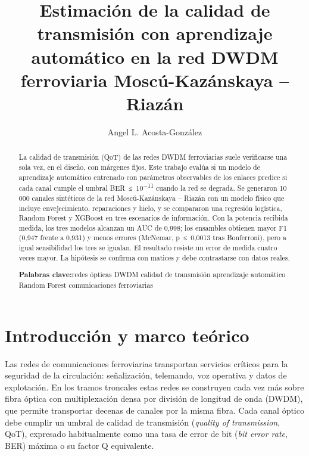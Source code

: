 \documentclass[runningheads]{llncs}
\def\keywordname{\textbf{Palabras clave:}}
\newcommand{\keywords}[1]{\par\addvspace\baselineskip\noindent\keywordname\enspace\ignorespaces#1}
\begin{document}
\mainmatter

\title{Estimación de la calidad de transmisión con aprendizaje automático en la red DWDM ferroviaria Moscú-Kazánskaya – Riazán}
\author{Angel L. Acosta-González}
\maketitle

\begin{abstract}
La calidad de transmisión (QoT) de las redes DWDM ferroviarias suele verificarse una sola vez, en el diseño, con márgenes fijos. Este trabajo evalúa si un modelo de aprendizaje automático entrenado con parámetros observables de los enlaces predice si cada canal cumple el umbral BER~≤~10\textsuperscript{−11} cuando la red se degrada. Se generaron 10 000 canales sintéticos de la red Moscú-Kazánskaya – Riazán con un modelo físico que incluye envejecimiento, reparaciones y hielo, y se compararon una regresión logística, Random Forest y XGBoost en tres escenarios de información. Con la potencia recibida medida, los tres modelos alcanzan un AUC de 0,998; los ensambles obtienen mayor F1 (0,947 frente a 0,931) y menos errores (McNemar, p~≤~0,0013 tras Bonferroni), pero a igual sensibilidad los tres se igualan. El resultado resiste un error de medida cuatro veces mayor. La hipótesis se confirma con matices y debe contrastarse con datos reales.
\keywords{redes ópticas DWDM \textperiodcentered{} calidad de transmisión \textperiodcentered{} aprendizaje automático \textperiodcentered{} Random Forest \textperiodcentered{} comunicaciones ferroviarias}
\end{abstract}


\section{Introducción y marco teórico}\label{sec:1}

Las redes de comunicaciones ferroviarias transportan servicios críticos para la seguridad de la circulación: señalización, telemando, voz operativa y datos de explotación. En los tramos troncales estas redes se construyen cada vez más sobre fibra óptica con multiplexación densa por división de longitud de onda (DWDM), que permite transportar decenas de canales por la misma fibra. Cada canal óptico debe cumplir un umbral de calidad de transmisión (\emph{quality of transmission}, QoT), expresado habitualmente como una tasa de error de bit (\emph{bit error rate}, BER) máxima o su factor Q equivalente.
\end{document}
